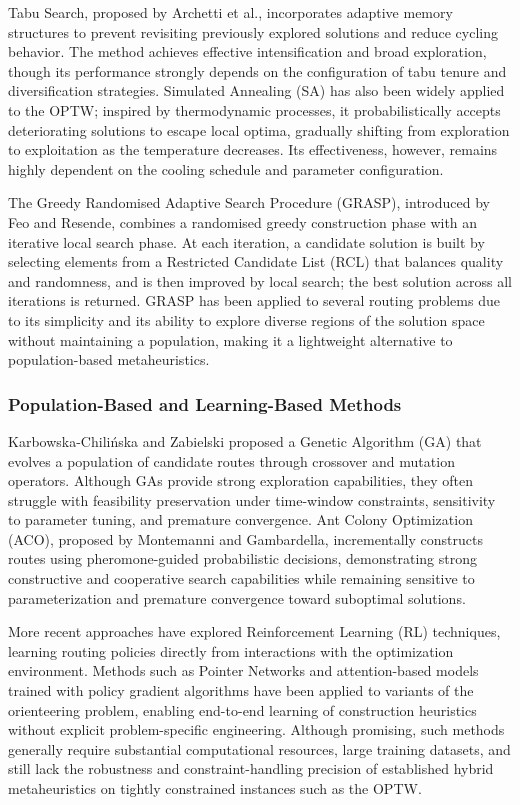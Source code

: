 Tabu Search, proposed by Archetti et al.\cite{Archetti}, incorporates adaptive memory structures to prevent revisiting previously explored solutions and reduce cycling behavior. The method achieves effective intensification and broad exploration, though its performance strongly depends on the configuration of tabu tenure and diversification strategies. Simulated Annealing (SA) has also been widely applied to the OPTW; inspired by thermodynamic processes, it probabilistically accepts deteriorating solutions to escape local optima, gradually shifting from exploration to exploitation as the temperature decreases. Its effectiveness, however, remains highly dependent on the cooling schedule and parameter configuration.

The Greedy Randomised Adaptive Search Procedure (GRASP), introduced by Feo and Resende\cite{feo_greedy_1995}, combines a randomised greedy construction phase with an iterative local search phase. At each iteration, a candidate solution is built by selecting elements from a Restricted Candidate List (RCL) that balances quality and randomness, and is then improved by local search; the best solution across all iterations is returned. GRASP has been applied to several routing problems due to its simplicity and its ability to explore diverse regions of the solution space without maintaining a population, making it a lightweight alternative to population-based metaheuristics.

\subsubsection*{Population-Based and Learning-Based Methods}

Karbowska-Chili\'{n}ska and Zabielski\cite{Karbowska} proposed a Genetic Algorithm (GA) that evolves a population of candidate routes through crossover and mutation operators. Although GAs provide strong exploration capabilities, they often struggle with feasibility preservation under time-window constraints, sensitivity to parameter tuning, and premature convergence. Ant Colony Optimization (ACO), proposed by Montemanni and Gambardella\cite{montemanni2023antcolonyteamorienteering}, incrementally constructs routes using pheromone-guided probabilistic decisions, demonstrating strong constructive and cooperative search capabilities while remaining sensitive to parameterization and premature convergence toward suboptimal solutions.

More recent approaches have explored Reinforcement Learning (RL) techniques, learning routing policies directly from interactions with the optimization environment. Methods such as Pointer Networks and attention-based models trained with policy gradient algorithms have been applied to variants of the orienteering problem, enabling end-to-end learning of construction heuristics without explicit problem-specific engineering. Although promising, such methods generally require substantial computational resources, large training datasets, and still lack the robustness and constraint-handling precision of established hybrid metaheuristics on tightly constrained instances such as the OPTW.

